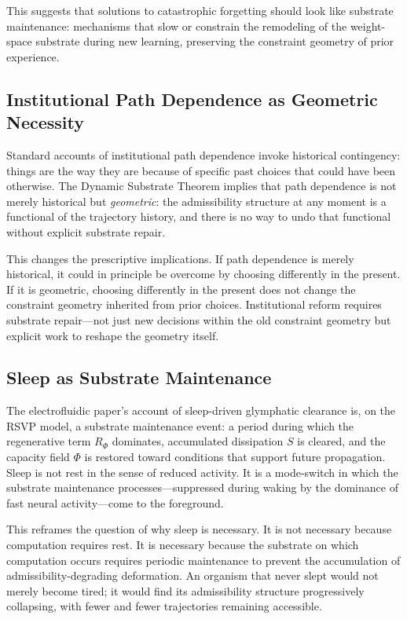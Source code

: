 \documentclass[12pt,a4paper]{article}
\begin{document}
This suggests that solutions to catastrophic forgetting should look like substrate maintenance: mechanisms that slow or constrain the remodeling of the weight-space substrate during new learning, preserving the constraint geometry of prior experience.

\subsection{Institutional Path Dependence as Geometric Necessity}

Standard accounts of institutional path dependence invoke historical contingency: things are the way they are because of specific past choices that could have been otherwise. The Dynamic Substrate Theorem implies that path dependence is not merely historical but \emph{geometric}: the admissibility structure at any moment is a functional of the trajectory history, and there is no way to undo that functional without explicit substrate repair.

This changes the prescriptive implications. If path dependence is merely historical, it could in principle be overcome by choosing differently in the present. If it is geometric, choosing differently in the present does not change the constraint geometry inherited from prior choices. Institutional reform requires substrate repair---not just new decisions within the old constraint geometry but explicit work to reshape the geometry itself.

\subsection{Sleep as Substrate Maintenance}

The electrofluidic paper's account of sleep-driven glymphatic clearance is, on the RSVP model, a substrate maintenance event: a period during which the regenerative term $R_\Phi$ dominates, accumulated dissipation $S$ is cleared, and the capacity field $\Phi$ is restored toward conditions that support future propagation. Sleep is not rest in the sense of reduced activity. It is a mode-switch in which the substrate maintenance processes---suppressed during waking by the dominance of fast neural activity---come to the foreground.

This reframes the question of why sleep is necessary. It is not necessary because computation requires rest. It is necessary because the substrate on which computation occurs requires periodic maintenance to prevent the accumulation of admissibility-degrading deformation. An organism that never slept would not merely become tired; it would find its admissibility structure progressively collapsing, with fewer and fewer trajectories remaining accessible.
\end{document}
